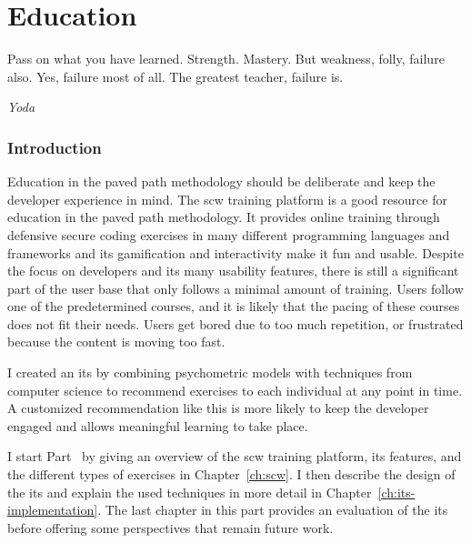 \part{Education}
\label{p:education}
\epigraph{Pass on what you have learned. Strength. Mastery. But weakness, folly, failure also. Yes, failure most of all. The greatest teacher, failure is.}{\textit{Yoda}}

\clearpage
\section*{Introduction}
Education in the paved path methodology should be deliberate and keep the developer experience in mind.
The \gls{scw} training platform is a good resource for education in the paved path methodology. 
It provides online training through defensive secure coding exercises in many different programming languages and frameworks and its gamification and interactivity make it fun and usable.
%
Despite the focus on developers and its many usability features, there is still a significant part of the user base that only follows a minimal amount of training.
Users follow one of the predetermined courses, and it is likely that the pacing of these courses does not fit their needs.
Users get bored due to too much repetition, or frustrated because the content is moving too fast.

I created an \gls{its} by combining psychometric models with techniques from computer science to recommend exercises to each individual at any point in time. 
A customized recommendation like this is more likely to keep the developer engaged and allows meaningful learning to take place.

I start Part~\ref{p:education} by giving an overview of the \gls{scw} training platform, its features, and the different types of exercises in Chapter~\ref{ch:scw}.
I then describe the design of the \gls{its} and explain the used techniques in more detail in Chapter~\ref{ch:its-implementation}.
The last chapter in this part provides an evaluation of the \gls{its} before offering some perspectives that remain future work.

